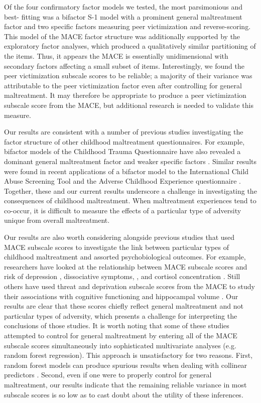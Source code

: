 \documentclass[letterpaper,man,natbib,floatsintext,longtable]{apa6}
\begin{document}
Of the four confirmatory factor models we tested, the most parsimonious and best- fitting was a bifactor S-1 model with a prominent general maltreatment factor and two specific factors measuring peer victimization and reverse-scoring. This model of the MACE factor structure was additionally supported by the exploratory factor analyses, which produced a qualitatively similar partitioning of the items. Thus, it appears the MACE is essentially unidimensional with secondary factors affecting a small subset of items. Interestingly, we found the peer victimization subscale scores to be reliable; a majority of their variance was attributable to the peer victimization factor even after controlling for general maltreatment. It may therefore be appropriate to produce a peer victimization subscale score from the MACE, but additional research is needed to validate this measure.

Our results are consistent with a number of previous studies investigating the factor structure of other childhood maltreatment questionnaires. For example, bifactor models of the Childhood Trauma Questionnaire have also revealed a dominant general maltreatment factor and weaker specific factors \citep{spinhoven2014childhood, stagaki2022mediating}. Similar results were found in recent applications of a bifactor model to the International Child Abuse Screening Tool \citep{meinck2021factor} and the Adverse Childhood Experience questionnaire \citep{dobson2021latent}. Together, these and our current results underscore a challenge in investigating the consequences of childhood maltreatment. When maltreatment experiences tend to co-occur, it is difficult to measure the effects of a particular type of adversity unique from overall maltreatment.  
 
Our results are also worth considering alongside previous studies that used MACE subscale scores to investigate the link between particular types of childhood maltreatment and assorted psychobiological outcomes. For example, researchers have looked at the relationship between MACE subscale scores and risk of depression \citep{gerke2018childhood}, dissociative symptoms, \citep{schalinski2015type}, and cortisol concentration \citep{schalinski2019early}. Still others have used threat and deprivation subscale scores from the MACE to study their associations with cognitive functioning \citep{schalinski2018defining} and hippocampal volume \citep{teicher2018differential}. Our results are clear that these scores chiefly reflect general maltreatment and not particular types of adversity, which presents a challenge for interpreting the conclusions of those studies. It is worth noting that some of these studies attempted to control for general maltreatment by entering all of the MACE subscale scores simultaneously into sophisticated multivariate analyses (e.g. random forest regression). This approach is unsatisfactory for two reasons. First, random forest models can produce spurious results when dealing with collinear predictors \citep{gregorutti2017correlation}. Second, even if one were to properly control for general maltreatment, our results indicate that the remaining reliable variance in most subscale scores is so low as to cast doubt about the utility of these inferences.
\end{document}
